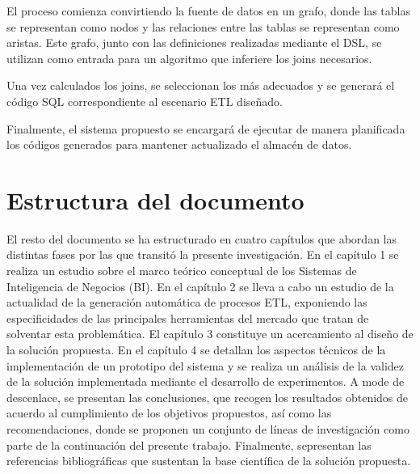El proceso comienza convirtiendo la fuente de datos en un grafo, donde las tablas se representan como nodos y las relaciones 
entre las tablas se representan como aristas. Este grafo, junto con las definiciones realizadas mediante el DSL, se utilizan 
como entrada para un algoritmo que inferiere los joins necesarios.

Una vez calculados los joins, se seleccionan los más adecuados y se generará el 
código SQL correspondiente al escenario ETL diseñado.

Finalmente, el sistema propuesto se encargará de ejecutar de manera planificada los códigos generados para mantener actualizado 
el almacén de datos. 

\section{Estructura del documento}

El resto del documento se ha estructurado en cuatro capítulos que abordan las distintas fases por las que transitó la 
presente investigación. En el cap\'itulo 1 se realiza un estudio sobre el marco te\'orico conceptual de los Sistemas de 
Inteligencia de Negocios (BI). En el cap\'itulo 2 se lleva a cabo un estudio de la actualidad de la generaci\'on autom\'atica 
de procesos ETL, exponiendo las especificidades de las principales herramientas del mercado que tratan de solventar esta 
problem\'atica. El cap\'itulo 3 constituye un acercamiento al diseño de la soluci\'on propuesta. En el capítulo 4 se 
detallan los aspectos técnicos de la implementación de un prototipo del sistema y se realiza un análisis de la validez de 
la solución implementada mediante el desarrollo de experimentos. A mode de descenlace, se presentan las conclusiones,
que recogen los resultados obtenidos de acuerdo al cumplimiento de los objetivos propuestos, así como las recomendaciones, 
donde se proponen un conjunto de líneas de investigación como parte de la continuación del presente trabajo. Finalmente, 
sepresentan las referencias bibliográficas que sustentan la base científica de la solución propuesta.
